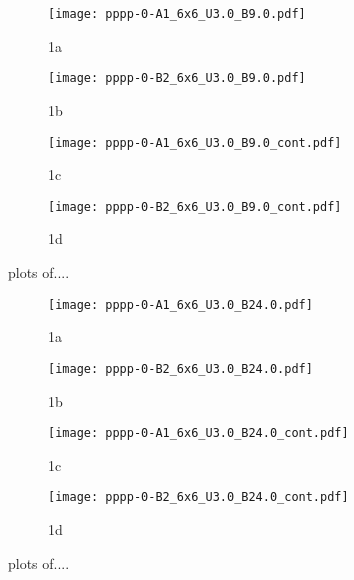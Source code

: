 \begin{figure}
  \begin{subfigure}{.5\textwidth}
    \centering
    \texttt{[image: pppp-0-A1\_6x6\_U3.0\_B9.0.pdf]}
    \caption{1a}
    \label{fig:sfig1}
  \end{subfigure}%
  \begin{subfigure}{.5\textwidth}
    \centering
    \texttt{[image: pppp-0-B2\_6x6\_U3.0\_B9.0.pdf]}
    \caption{1b}
    \label{fig:sfig2}
  \end{subfigure}
  \begin{subfigure}{.5\textwidth}
      \centering
      \texttt{[image: pppp-0-A1\_6x6\_U3.0\_B9.0\_cont.pdf]}
      \caption{1c}
      \label{fig:sfig3}
  \end{subfigure}
  \begin{subfigure}{.5\textwidth}
      \centering
      \texttt{[image: pppp-0-B2\_6x6\_U3.0\_B9.0\_cont.pdf]}
      \caption{1d}
      \label{fig:sfig4}
  \end{subfigure}
  \caption{plots of....}
  \label{fig:fig}
\end{figure}

\begin{figure}
  \begin{subfigure}{.5\textwidth}
    \centering
    \texttt{[image: pppp-0-A1\_6x6\_U3.0\_B24.0.pdf]}
    \caption{1a}
    \label{fig:sfig1}
  \end{subfigure}%
  \begin{subfigure}{.5\textwidth}
    \centering
    \texttt{[image: pppp-0-B2\_6x6\_U3.0\_B24.0.pdf]}
    \caption{1b}
    \label{fig:sfig2}
  \end{subfigure}
  \begin{subfigure}{.5\textwidth}
      \centering
      \texttt{[image: pppp-0-A1\_6x6\_U3.0\_B24.0\_cont.pdf]}
      \caption{1c}
      \label{fig:sfig3}
  \end{subfigure}
  \begin{subfigure}{.5\textwidth}
      \centering
      \texttt{[image: pppp-0-B2\_6x6\_U3.0\_B24.0\_cont.pdf]}
      \caption{1d}
      \label{fig:sfig4}
  \end{subfigure}
  \caption{plots of....}
  \label{fig:fig}
\end{figure}

